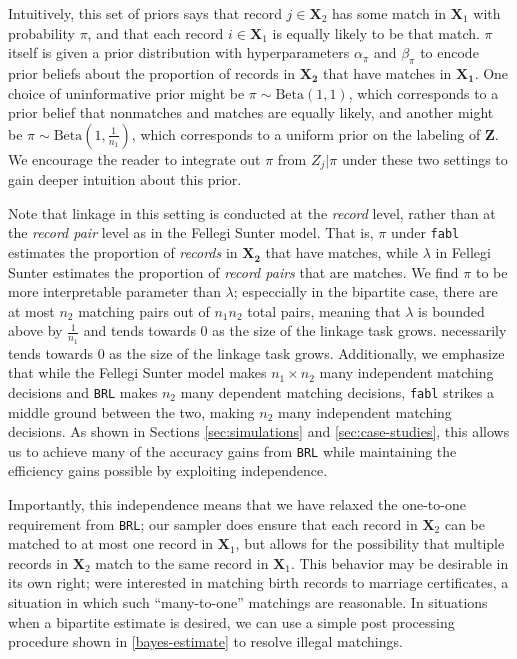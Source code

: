 \documentclass[12pt,letterpaper]{article}
\newcommand{\1}[1]{\mathbb{I}\!\left[#1\right]} %
\begin{document}
Intuitively, this set of priors says that record $j \in \bm{X}_2$ has some match in $\bm{X}_1$ with probability $\pi$, and that each record $i \in \bm{X}_1$ is equally likely to be that match. $\pi$ itself is given a prior distribution with hyperparameters $\alpha_{\pi}$ and $\beta_{\pi}$ to encode prior beliefs about  the proportion of records in $\bm{X_2}$ that have matches in $\bm{X_1}$. One choice of uninformative prior might be \(\pi \sim \text{Beta}(1, 1)\), which corresponds to a prior belief that nonmatches and matches are equally likely, and another might be \(\pi \sim \text{Beta}\left(1, \frac{1}{n_1}\right)\), which corresponds to a uniform prior on the labeling of \(\bm{Z}\). We encourage the reader to integrate out $\pi$ from $Z_j|\pi$ under these two settings to gain deeper intuition about this prior. 

Note that linkage in this setting is conducted at the \emph{record} level, rather than at the \emph{record pair} level as in the Fellegi Sunter model. That is, $\pi$ under \texttt{fabl} estimates the proportion of \emph{records} in $\bm{X_2}$ that have matches, while $\lambda$ in Fellegi Sunter estimates the proportion of \emph{record pairs} that are matches. We find $\pi$ to be more interpretable parameter than $\lambda$; especcially in the bipartite case, there are at most $n_2$ matching pairs out of $n_1 n_2$ total pairs, meaning that $\lambda$ is bounded above by $\frac{1}{n_1}$ and tends towards 0 as the size of the linkage task grows.  necessarily tends towards 0 as the size of the linkage task grows. Additionally, we emphasize that while the Fellegi Sunter model makes $n_1 \times n_2$ many independent matching decisions and \texttt{BRL} makes $n_2$ many dependent matching decisions, \texttt{fabl} strikes a middle ground between the two, making $n_2$ many independent matching decisions. As shown in Sections \ref{sec:simulations} and \ref{sec:case-studies}, this allows us to achieve many of the accuracy gains from \texttt{BRL} while maintaining the efficiency gains possible by exploiting independence. 

Importantly, this independence means that we have relaxed the one-to-one requirement from \texttt{BRL}; our sampler does ensure that each record in \(\bm{X}_2\) can be matched to at most one record in \(\bm{X}_1\), but allows for the possibility that multiple records in \(\bm{X}_2\) match to the same record in \(\bm{X}_1\). This behavior may be desirable in its own right; \cite{Newcombe1962b} were interested in matching birth records to marriage certificates, a situation in which such ``many-to-one'' matchings are reasonable. In situations when a bipartite estimate is desired, we can use a simple post processing procedure shown in \ref{bayes-estimate} to resolve illegal matchings.  
\end{document}
